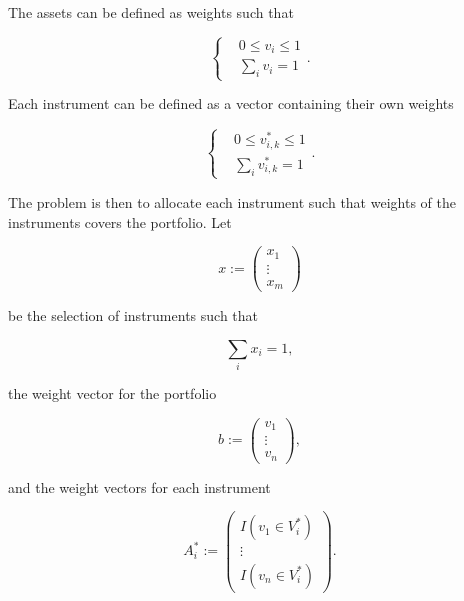 \documentclass{article}
\begin{document}
\noindent The assets can be defined as weights such that 

\begin{equation}
    \begin{cases}
        & 0 \leq v_i \leq 1 \\
        & \sum_i v_i = 1
    \end{cases}.
\end{equation}

\noindent Each instrument can be defined as a vector containing their own weights

\begin{equation}
    \begin{cases}
        & 0 \leq v^*_{i,k} \leq 1 \\
        & \sum_i v^*_{i,k} = 1
    \end{cases}.
\end{equation}

\noindent The problem is then to allocate each instrument such that weights of the instruments covers the portfolio. Let

\begin{equation}
    x := 
    \begin{pmatrix}
        x_1 \\
        \vdots \\
        x_m
    \end{pmatrix}
\end{equation}

\noindent be the selection of instruments such that 

\begin{equation}
    \sum_i x_i = 1,
\end{equation}

\noindent the weight vector for the portfolio

\begin{equation}
    b := 
    \begin{pmatrix}
        v_1 \\
        \vdots \\
        v_n
    \end{pmatrix},
\end{equation}

\noindent and the weight vectors for each instrument

\begin{equation}
    A^*_i := 
    \begin{pmatrix}
        I(v_1 \in V^*_i) \\
        \vdots \\
        I(v_n \in V^*_i)
    \end{pmatrix}.
\end{equation}
\end{document}
